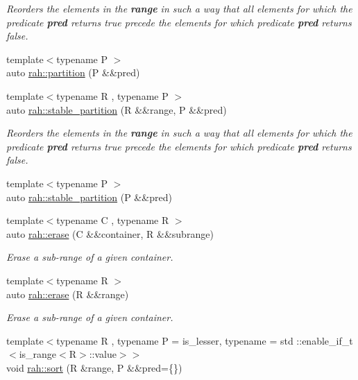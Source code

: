 \begin{DoxyCompactItemize}
\begin{DoxyCompactList}\small\item\em Reorders the elements in the {\bfseries{range}} in such a way that all elements for which the predicate {\bfseries{pred}} returns {\ttfamily true} precede the elements for which predicate {\bfseries{pred}} returns {\ttfamily false}. \end{DoxyCompactList}\item 
{\footnotesize template$<$typename P $>$ }\\auto \mbox{\hyperlink{namespacerah_afeced5adb7a17c0c8f34b64559ddc60c}{rah\+::partition}} (P \&\&pred)
\item 
{\footnotesize template$<$typename R , typename P $>$ }\\auto \mbox{\hyperlink{namespacerah_ac184b21a98515705f9b4845875fb689b}{rah\+::stable\+\_\+partition}} (R \&\&range, P \&\&pred)
\begin{DoxyCompactList}\small\item\em Reorders the elements in the {\bfseries{range}} in such a way that all elements for which the predicate {\bfseries{pred}} returns {\ttfamily true} precede the elements for which predicate {\bfseries{pred}} returns false. \end{DoxyCompactList}\item 
{\footnotesize template$<$typename P $>$ }\\auto \mbox{\hyperlink{namespacerah_ae51c8e542493089f60675db2d0018329}{rah\+::stable\+\_\+partition}} (P \&\&pred)
\item 
{\footnotesize template$<$typename C , typename R $>$ }\\auto \mbox{\hyperlink{namespacerah_a3b055c0e04f784b9abc89a27ef4534dd}{rah\+::erase}} (C \&\&container, R \&\&subrange)
\begin{DoxyCompactList}\small\item\em Erase a sub-\/range of a given container. \end{DoxyCompactList}\item 
{\footnotesize template$<$typename R $>$ }\\auto \mbox{\hyperlink{namespacerah_a80ea7a94642c23e9f3db6f6b890f2987}{rah\+::erase}} (R \&\&range)
\begin{DoxyCompactList}\small\item\em Erase a sub-\/range of a given container. \end{DoxyCompactList}\item 
{\footnotesize template$<$typename R , typename P  = is\+\_\+lesser, typename  = std \+::enable\+\_\+if\+\_\+t$<$is\+\_\+range$<$\+R$>$\+::value$>$$>$ }\\void \mbox{\hyperlink{namespacerah_a02bc4f7618438272f7ec9f3c819d5990}{rah\+::sort}} (R \&range, P \&\&pred=\{\})

\end{DoxyCompactItemize}

